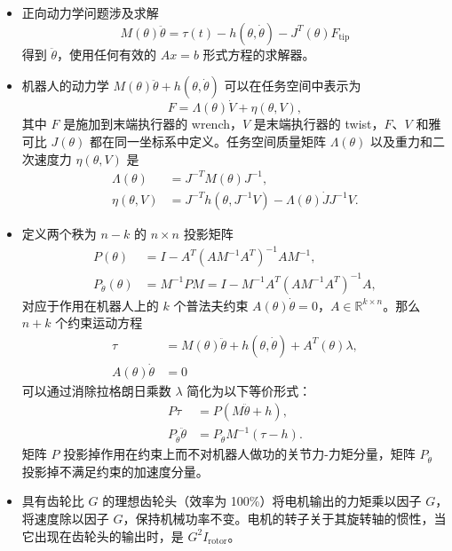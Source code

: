 \documentclass[12pt,a4paper]{article}
\begin{document}
\begin{itemize}
\item 正向动力学问题涉及求解
\begin{equation}
M(\theta)\ddot{\theta} = \tau(t) - h(\theta, \dot{\theta}) - J^T(\theta)F_{\text{tip}}
\end{equation}
得到 $\ddot{\theta}$，使用任何有效的 $Ax = b$ 形式方程的求解器。

\item 机器人的动力学 $M(\theta)\ddot{\theta} + h(\theta, \dot{\theta})$ 可以在任务空间中表示为
\begin{equation}
F = \Lambda(\theta)\dot{V} + \eta(\theta, V),
\end{equation}
其中 $F$ 是施加到末端执行器的 wrench，$V$ 是末端执行器的 twist，$F$、$V$ 和雅可比 $J(\theta)$ 都在同一坐标系中定义。任务空间质量矩阵 $\Lambda(\theta)$ 以及重力和二次速度力 $\eta(\theta, V)$ 是
\begin{align}
\Lambda(\theta) &= J^{-T}M(\theta)J^{-1}, \\
\eta(\theta, V) &= J^{-T}h(\theta, J^{-1}V) - \Lambda(\theta)\dot{J}J^{-1}V.
\end{align}

\item 定义两个秩为 $n-k$ 的 $n \times n$ 投影矩阵
\begin{align}
P(\theta) &= I - A^T(AM^{-1}A^T)^{-1}AM^{-1}, \\
P_{\ddot{\theta}}(\theta) &= M^{-1}PM = I - M^{-1}A^T(AM^{-1}A^T)^{-1}A,
\end{align}
对应于作用在机器人上的 $k$ 个普法夫约束 $A(\theta)\dot{\theta} = 0$，$A \in \mathbb{R}^{k \times n}$。那么 $n+k$ 个约束运动方程
\begin{align}
\tau &= M(\theta)\ddot{\theta} + h(\theta, \dot{\theta}) + A^T(\theta)\lambda, \\
A(\theta)\dot{\theta} &= 0
\end{align}
可以通过消除拉格朗日乘数 $\lambda$ 简化为以下等价形式：
\begin{align}
P\tau &= P(M\ddot{\theta} + h), \\
P_{\ddot{\theta}}\ddot{\theta} &= P_{\ddot{\theta}}M^{-1}(\tau - h).
\end{align}
矩阵 $P$ 投影掉作用在约束上而不对机器人做功的关节力-力矩分量，矩阵 $P_{\ddot{\theta}}$ 投影掉不满足约束的加速度分量。

\item 具有齿轮比 $G$ 的理想齿轮头（效率为 100\%）将电机输出的力矩乘以因子 $G$，将速度除以因子 $G$，保持机械功率不变。电机的转子关于其旋转轴的惯性，当它出现在齿轮头的输出时，是 $G^2 I_{\text{rotor}}$。
\end{itemize}
\end{document}
